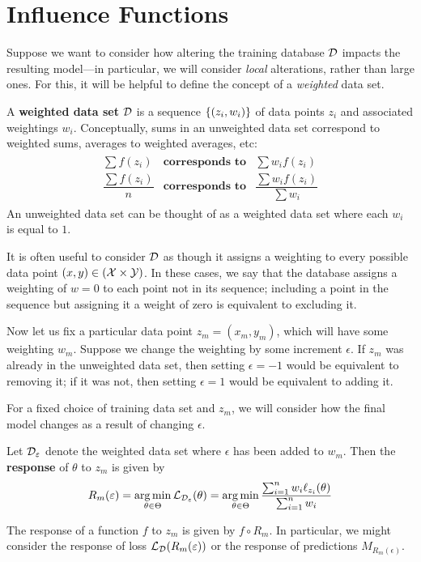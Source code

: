 \documentclass[12pt,twoside]{reedthesis}
\begin{document}
\section{Influence Functions}
Suppose we want to consider how altering the training database $\mathcal{D}$ impacts the resulting model—in particular, we will consider \textit{local} alterations, rather than large ones. For this, it will be helpful to define the concept of a \textit{weighted} data set.

\begin{definition}
    A \textbf{weighted data set} $\mathcal{D}$ is a sequence $\left\{ (z_i, w_i) \right\}$ of data points $z_i$ and associated weightings $w_i$. Conceptually, sums in an unweighted data set correspond to weighted sums, averages to weighted averages, etc:
    \begin{align*}
    \begin{array}{ccc}
        \sum f(z_i) & \textbf{corresponds to} & \sum w_i f(z_i)\\
        \dfrac{\sum f(z_i)}{n} & \textbf{corresponds to} & \dfrac{\sum w_i f(z_i)}{\sum w_i}
    \end{array}
    \end{align*}
    An unweighted data set can be thought of as a weighted data set where each $w_i$ is equal to $1$.
    
    It is often useful to consider $\mathcal{D}$ as though it assigns a weighting to every possible data point $(x, y) \in (\mathcal{X} \times \mathcal{Y})$. In these cases, we say that the database assigns a weighting of $w = 0$ to each point not in its sequence; including a point in the sequence but assigning it a weight of zero is equivalent to excluding it.
\end{definition}

Now let us fix a particular data point $z_m = (x_m, y_m)$, which will have some weighting $w_m$. Suppose we change the weighting by some increment $\epsilon$. If $z_m$ was already in the unweighted data set, then setting $\epsilon = -1$ would be equivalent to removing it; if it was not, then setting $\epsilon = 1$ would be equivalent to adding it.

For a fixed choice of training data set and $z_m$, we will consider how the final model changes as a result of changing $\epsilon$.

\begin{definition}
    Let $\mathcal{D}_\varepsilon$ denote the weighted data set where $\epsilon$ has been added to $w_m$. Then the \textbf{response} of $\theta$ to $z_m$ is given by \begin{equation}
        R_{m}(\varepsilon) = \operatorname*{arg\,min}_{\theta \in \Theta} \mathcal{L}_{\mathcal{D}_\varepsilon}(\theta) = \operatorname*{arg\,min}_{\theta \in \Theta}\dfrac{\sum_{i=1}^n w_i \ell_{z_i}(\theta)}{\sum_{i=1}^n w_i}
    \end{equation}

    The response of a function $f$ to $z_m$ is given by $f \circ R_m$. In particular, we might consider the response of loss $\mathcal{L}_{\mathcal{D}}(R_m(\varepsilon))$ or the response of predictions $M_{R_m(\epsilon)}$.
    \end{definition}
\end{document}
